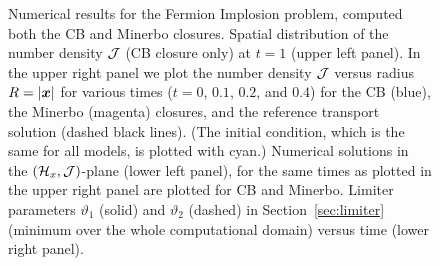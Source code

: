 \begin{figure}[H]
   \caption{Numerical results for the Fermion Implosion problem, computed both the CB and Minerbo closures.  Spatial distribution of the number density $\mathcal{J}$ (CB closure only) at $t=1$ (upper left panel).  In the upper right panel we plot the number density $\mathcal{J}$ versus radius $R=|\boldsymbol{x}|$ for various times ($t=0$, $0.1$, $0.2$, and $0.4$) for the CB (blue), the Minerbo (magenta) closures, and the reference transport solution (dashed black lines).  (The initial condition, which is the same for all models, is plotted with cyan.)  Numerical solutions in the $(\mathcal{H}_{x},\mathcal{J})$-plane (lower left panel), for the same times as plotted in the upper right panel are plotted for CB and Minerbo.  Limiter parameters $\vartheta_{1}$ (solid) and $\vartheta_{2}$ (dashed) in Section~\ref{sec:limiter} (minimum over the whole computational domain) versus time (lower right panel).}
  \label{fig:Implosion}
\end{figure}

